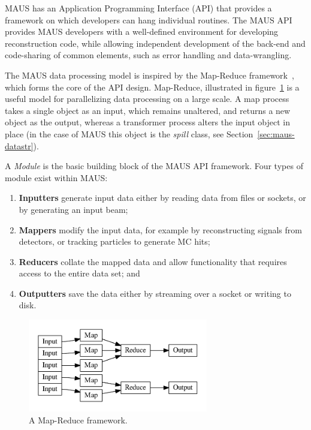 \documentclass[11pt]{article}
\begin{document}
MAUS has an Application Programming Interface (API) that provides a framework on which developers can hang individual routines. The MAUS API provides MAUS developers with a well-defined environment for developing reconstruction code, while allowing independent development of the back-end and code-sharing of common elements, such as error handling and data-wrangling. 

The MAUS data processing model is inspired by the Map-Reduce framework~\cite{MapReduce}, which forms the core of the API design. Map-Reduce, illustrated in figure~\ref{fig:mapreduce} is a useful model for parallelizing data processing on a large scale. A map process takes a single object as an input, which remains unaltered, and returns a new object as the output, whereas a transformer process alters the input object in place (in the case of MAUS this object is the \emph{spill} class, see Section~\ref{sec:maus-datastr}).

A \emph{Module} is the basic building block of the MAUS API framework. Four types of module exist within MAUS:

\begin{enumerate}
\item \textbf{Inputters} generate input data either by reading data from files or sockets, or by generating an input beam;
\item \textbf{Mappers} modify the input data, for example by reconstructing signals from detectors, or tracking  particles to generate MC hits;
\item \textbf{Reducers} collate the mapped data and allow functionality that requires access to the entire data set; and
\item \textbf{Outputters} save the data  either by streaming over a socket or writing to disk.
\end{enumerate}

\begin{figure}[!htb]
\centering
\includegraphics[width=0.7\textwidth]{figs/map_reduce.pdf}
\caption{A Map-Reduce framework.}
\label{fig:mapreduce}
\end{figure}
\end{document}
